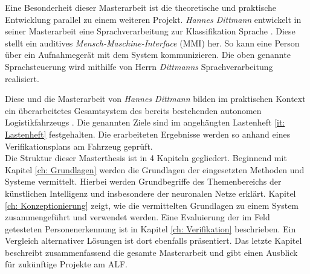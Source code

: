 		Eine Besonderheit dieser Masterarbeit ist die theoretische und praktische Entwicklung parallel zu einem weiteren Projekt. \textit{Hannes Dittmann} entwickelt in seiner Masterarbeit eine Sprachverarbeitung zur Klassifikation Sprache \cite{Dittmann}. Diese stellt ein auditives \textit{Mensch-Maschine-Interface} (MMI) her. So kann eine Person über ein Aufnahmegerät mit dem System kommunizieren. Die oben genannte Sprachsteuerung wird mithilfe von Herrn \textit{Dittmanns} Sprachverarbeitung realisiert. 
		
		Diese und die Masterarbeit von \textit{Hannes Dittmann} bilden im praktischen Kontext ein überarbeitetes Gesamtsystem des bereits bestehenden autonomen Logistikfahrzeugs \cite{Dittmann}. Die genannten Ziele sind im angehängten Lastenheft \ref{it: Lastenheft} festgehalten. Die erarbeiteten Ergebnisse werden so anhand eines Verifikationsplans am Fahrzeug geprüft.\\
		
		Die Struktur dieser Masterthesis ist in 4 Kapiteln gegliedert. Beginnend mit Kapitel \ref{ch: Grundlagen} werden die Grundlagen der eingesetzten Methoden und Systeme vermittelt. Hierbei werden Grundbegriffe des Themenbereichs der künstlichen Intelligenz und insbesondere der neuronalen Netze erklärt. Kapitel \ref{ch: Konzeptionierung} zeigt, wie die vermittelten Grundlagen zu einem System zusammengeführt und verwendet werden. Eine Evaluierung der im Feld getesteten Personenerkennung ist in Kapitel \ref{ch: Verifikation} beschrieben. Ein Vergleich alternativer Lösungen ist dort ebenfalls präsentiert. Das letzte Kapitel beschreibt zusammenfassend die gesamte Masterarbeit und gibt einen Ausblick für zukünftige Projekte am ALF. \\
		
		
		
		
		
		
	